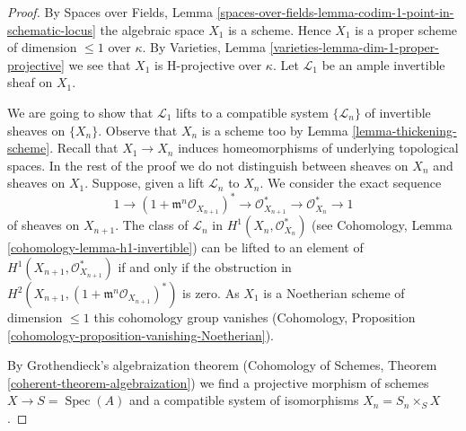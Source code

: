 \documentclass[10pt,a4paper]{amsart}
\theoremstyle{plain}
\theoremstyle{definition}
\theoremstyle{remark}
\numberwithin{equation}{subsection}
\def\Spec{\mathop{\mathrm{Spec}}}
\begin{document}
\begin{proof}
By Spaces over Fields, Lemma
\ref{spaces-over-fields-lemma-codim-1-point-in-schematic-locus}
the algebraic space $X_1$ is a scheme. Hence $X_1$
is a proper scheme of dimension $\leq 1$ over $\kappa$.
By Varieties, Lemma \ref{varieties-lemma-dim-1-proper-projective}
we see that $X_1$ is H-projective over $\kappa$.
Let $\mathcal{L}_1$ be an ample invertible sheaf on $X_1$.

\medskip\noindent
We are going to show that $\mathcal{L}_1$ lifts to a compatible system
$\{\mathcal{L}_n\}$ of invertible sheaves on $\{X_n\}$.
Observe that $X_n$ is a scheme too by Lemma \ref{lemma-thickening-scheme}.
Recall that $X_1 \to X_n$ induces homeomorphisms of underlying
topological spaces. In the rest of the proof we do not distinguish
between sheaves on $X_n$ and sheaves on $X_1$.
Suppose, given a lift $\mathcal{L}_n$ to $X_n$. We consider
the exact sequence
$$
1 \to
(1 + \mathfrak m^n\mathcal{O}_{X_{n + 1}})^* \to
\mathcal{O}_{X_{n + 1}}^* \to \mathcal{O}_{X_n}^* \to 1
$$
of sheaves on $X_{n + 1}$. The class of $\mathcal{L}_n$ in
$H^1(X_n, \mathcal{O}_{X_n}^*)$ (see
Cohomology, Lemma \ref{cohomology-lemma-h1-invertible})
can be lifted to an element of $H^1(X_{n + 1}, \mathcal{O}_{X_{n + 1}}^*)$
if and only if the obstruction in
$H^2(X_{n + 1}, (1 + \mathfrak m^n\mathcal{O}_{X_{n + 1}})^*)$
is zero. As $X_1$ is a Noetherian scheme of dimension $\leq 1$
this cohomology group vanishes (Cohomology, Proposition
\ref{cohomology-proposition-vanishing-Noetherian}).

\medskip\noindent
By Grothendieck's algebraization theorem
(Cohomology of Schemes, Theorem \ref{coherent-theorem-algebraization})
we find a projective morphism of schemes $X \to S = \Spec(A)$
and a compatible system of isomorphisms $X_n = S_n \times_S X$.
\end{proof}
\end{document}
